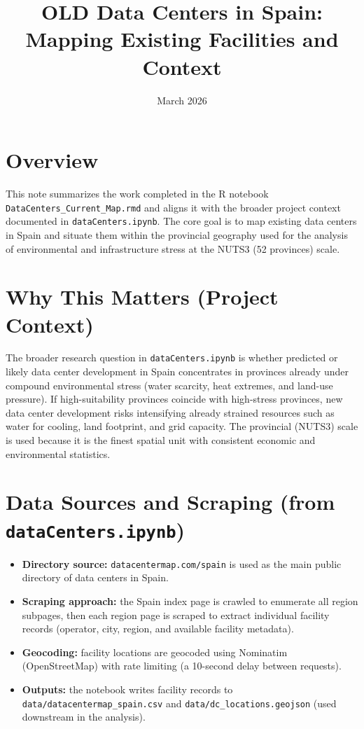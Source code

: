 \documentclass[11pt]{article}
\title{OLD Data Centers in Spain: Mapping Existing Facilities and Context}
\author{}
\date{March 2026}
\begin{document}
\maketitle

\section*{Overview}
This note summarizes the work completed in the R notebook \texttt{DataCenters\_Current\_Map.rmd} and
aligns it with the broader project context documented in \texttt{dataCenters.ipynb}. The core goal is
to map existing data centers in Spain and situate them within the provincial geography used for the
analysis of environmental and infrastructure stress at the NUTS3 (52 provinces) scale.

\section*{Why This Matters (Project Context)}
The broader research question in \texttt{dataCenters.ipynb} is whether predicted or likely data center
development in Spain concentrates in provinces already under compound environmental stress
(water scarcity, heat extremes, and land-use pressure). If high-suitability provinces coincide with
high-stress provinces, new data center development risks intensifying already strained resources
such as water for cooling, land footprint, and grid capacity. The provincial (NUTS3) scale is used
because it is the finest spatial unit with consistent economic and environmental statistics.

\section*{Data Sources and Scraping (from \texttt{dataCenters.ipynb})}
\begin{itemize}
  \item \textbf{Directory source:} \texttt{datacentermap.com/spain} is used as the main public directory
  of data centers in Spain.
  \item \textbf{Scraping approach:} the Spain index page is crawled to enumerate all region subpages,
  then each region page is scraped to extract individual facility records (operator, city, region, and
  available facility metadata).
  \item \textbf{Geocoding:} facility locations are geocoded using Nominatim (OpenStreetMap) with rate
  limiting (a 10-second delay between requests).
  \item \textbf{Outputs:} the notebook writes facility records to \texttt{data/datacentermap\_spain.csv}
  and \texttt{data/dc\_locations.geojson} (used downstream in the analysis).
\end{itemize}
\end{document}
